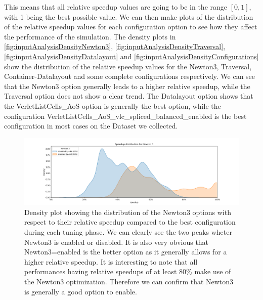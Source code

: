 This means that all relative speedup values are going to be in the range $[0,1]$, with 1 being the best possible value. We can then make plots of the distribution of the relative speedup values for each configuration option to see how they affect the performance of the simulation. The density plots in \autoref{fig:inputAnalysisDensityNewton3}, \autoref{fig:inputAnalysisDensityTraversal}, \autoref{fig:inputAnalysisDensityDatalayout} and \autoref{fig:inputAnalysisDensityConfigurations} show the distribution of the relative speedup values for the Newton3, Traversal, Container-Datalayout and some complete configurations respectively. We can see that the Newton3 option generally leads to a higher relative speedup, while the Traversal option does not show a clear trend. The Datalayout option shows that the VerletListCells\_AoS option is generally the best option, while the configuration VerletListCells\_AoS\_vlc\_spliced\_balanced\_enabled is the best configuration in most cases on the Dataset we collected.

\begin{figure}[h]
    \centering
    \includegraphics[width=\columnwidth,trim={1cm 0 2cm 1.5cm},clip]{figures/DataAnalytics/speedup_Newton 3.png}
    \caption[Speedup density plot of Newton 3 option]{Density plot showing the distribution of the Newton3 options with respect to their relative speedup compared to the best configuration during each tuning phase. We can clearly see the two peaks wheter Newton3 is enabled or disabled. It is also very obvious that Newton3=enabled is the better option as it generally allows for a higher relative speedup. It is interesting to note that all performances having relative speedups of at least 80\% make use of the Newton3 optimization. Therefore we can confirm that Newton3 is generally a good option to enable.}
    \label{fig:inputAnalysisDensityNewton3}
\end{figure}


